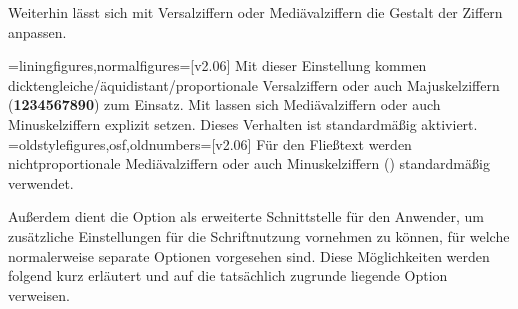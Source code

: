 \begin{DeclareEntity*}{}
\begin{DeclareEntity*}{}
\begin{DeclareEntity*}{}
\begin{Declaration}
\medskip\noindent%
%
Weiterhin lässt sich mit Versalziffern oder Mediävalziffern die Gestalt der 
Ziffern anpassen.
\begin{DeclareValues}
\itemval=liningfigures,normalfigures=[v2.06]
  Mit dieser Einstellung kommen dicktengleiche/äquidistant/proportionale 
  Versalziffern oder auch Majuskelziffern (\textbf{1234567890}) zum Einsatz.
  Mit  lassen sich Mediävalziffern oder 
  auch Minuskelziffern explizit setzen. Dieses Verhalten ist standardmäßig 
  aktiviert.
\itemval=oldstylefigures,osf,oldnumbers=[v2.06]
  Für den Fließtext werden nichtproportionale Mediävalziffern oder auch 
  Minuskelziffern (\textbf{}) standardmäßig verwendet.
\end{DeclareValues}

Außerdem dient die Option  als erweiterte Schnittstelle 
für den Anwender, um zusätzliche Einstellungen für die Schriftnutzung vornehmen 
zu können, für welche normalerweise separate Optionen vorgesehen sind. Diese 
Möglichkeiten werden folgend kurz erläutert und auf die tatsächlich zugrunde 
liegende Option verweisen.


\end{Declaration}
\end{DeclareEntity*}
\end{DeclareEntity*}
\end{DeclareEntity*}
